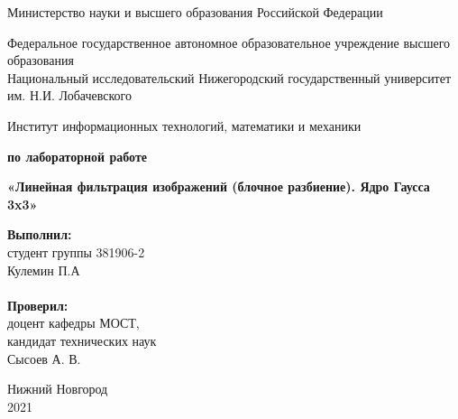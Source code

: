 \documentclass{report}
\begin{document}
\begin{titlepage}

\begin{center}
Министерство науки и высшего образования Российской Федерации
\end{center}

\begin{center}
Федеральное государственное автономное образовательное учреждение высшего образования \\
Национальный исследовательский Нижегородский государственный университет им. Н.И. Лобачевского
\end{center}

\begin{center}
Институт информационных технологий, математики и механики
\end{center}

\vspace{4em}

\begin{center}
\textbf{ по лабораторной работе} \\
\end{center}
\begin{center}
\textbf{\Large«Линейная фильтрация изображений (блочное разбиение). Ядро Гаусса 3x3»} \\
\end{center}

\vspace{4em}

\newbox{\lbox}
\newlength{\maxl}
\setlength{\maxl}{\wd\lbox}
\hfill\parbox{7cm}{
\hspace*{5cm}\hspace*{-5cm}\textbf{Выполнил:} \\ студент группы 381906-2 \\ Кулемин П.А\\
\\
\hspace*{5cm}\hspace*{-5cm}\textbf{Проверил:}\\ доцент кафедры МОСТ, \\ кандидат технических наук \\ Сысоев А. В.\\
}
\vspace{\fill}

\begin{center} Нижний Новгород \\ 2021 \end{center}

\end{titlepage}
\end{document}

